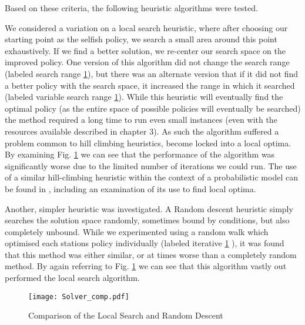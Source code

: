 \documentclass[12pt]{article}
\begin{document}
Based on these criteria, the following heuristic algorithms were tested.

We considered a variation on a local search heuristic, where after choosing our starting point as the selfish policy, we search a small area around this point exhaustively. If we find a better solution, we re-center our search space on the improved policy. One version of this algorithm did not change the search range (labeled search range \ref{fig:Solver_comp}), but there was an alternate version that if it did not find a better policy with the search space, it increased the range in which it searched (labeled variable search range \ref{fig:Solver_comp}). While this heuristic will eventually find the optimal policy (as the entire space of possible policies will eventually be searched) the method required a long time to run even small instances (even with the resources available described in chapter 3). As such the algorithm suffered a problem common to hill climbing heuristics, become locked into a local optima. By examining Fig. \ref{fig:Solver_comp} we can see that the performance of the algorithm was significantly worse due to the limited number of iterations we could run. The use of a similar hill-climbing heuristic within the context of a probabilistic model can be found in \cite{cite024}, including an examination of its use to find local optima.

 Another, simpler heuristic was investigated. A Random descent heuristic simply searches the solution space randomly, sometimes bound by conditions, but also completely unbound. While we experimented using a random walk which optimised each stations policy individually (labeled iterative \ref{fig:Solver_comp} ), it was found that this method was either similar, or at times worse than a completely random method. By again referring to Fig. \ref{fig:Solver_comp} we can see that this algorithm vastly out performed the local search algorithm.

\begin{figure}[ht]
    \begin{center}

		\texttt{[image: Solver\_comp.pdf]}
		\caption{Comparison of the Local Search and Random Descent}
		\label{fig:Solver_comp}
    \end{center}
\end{figure}


\end{document}
